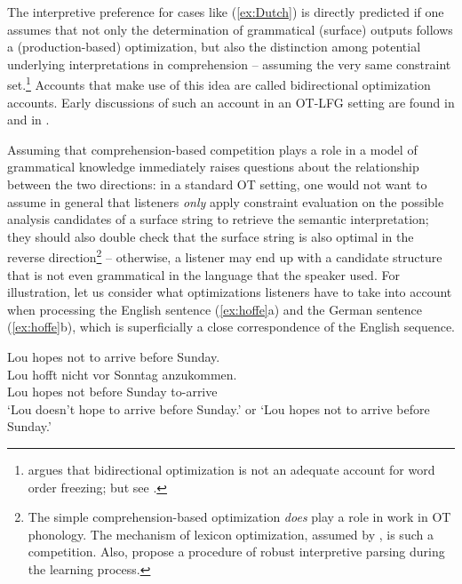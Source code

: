 \documentclass[output=paper,hidelinks]{langscibook}
\begin{document}
\noindent
\begin{sloppypar}
The interpretive preference for cases like (\ref{ex:Dutch}) is directly predicted if one assumes that not only the determination of grammatical (surface) outputs follows a (production-based) optimization, but also the distinction among potential underlying interpretations in comprehension -- assuming the very same constraint set.\footnote{\citet{Zeevat2006} argues that bidirectional optimization is not an adequate account for word order freezing; but see \citet{BoumaHendriks2012}. %
} Accounts that make use of this idea are called bidirectional optimization accounts. Early discussions of such an account in an 
OT-LFG setting are found in \citet{Lee-CSLI} and in \citet{Kuhn-LFG00,Kuhn-CSLI-book}.
\end{sloppypar}

\largerpage
Assuming that comprehension-based competition plays a role in a model of grammatical knowledge immediately raises questions about the relationship between the two directions: in a standard OT setting, one would not want to assume in general that listeners \emph{only} apply constraint evaluation on the possible analysis candidates of a surface string to retrieve the semantic interpretation; they should also double check that the surface string is also optimal in the reverse direction\footnote{The simple comprehension-based optimization \emph{does} play a role in work in OT phonology. The mechanism of lexicon optimization, assumed by \citet{PrinceSmolensky1993}, is such a competition. %
Also, \citet{TesarSmolensky1998} propose a procedure of robust interpretive parsing during the learning process.
}
-- otherwise, a listener may end up with a candidate structure that is not even grammatical in the language that the speaker used. For illustration, let us consider what optimizations listeners have to take into account when processing the English sentence (\ref{ex:hoffe}a) and the German sentence (\ref{ex:hoffe}b), which is superficially a close correspondence of the English sequence.

\ea\label{ex:hoffe}
\ea Lou hopes not to arrive before Sunday.
\\
\gll Lou hofft nicht vor Sonntag anzukommen. \\
Lou hopes not before Sunday to-arrive \\
\glt `Lou doesn't hope to arrive before Sunday.' or `Lou hopes not to arrive before Sunday.'
\z
\z
\end{document}
